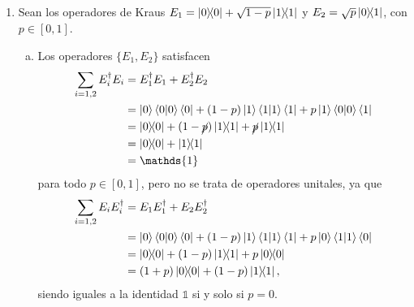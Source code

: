 \documentclass{scrartcl}
\DeclareRobustCommand{\[}{\begin{equation}}
\DeclareRobustCommand{\]}{\end{equation}}
\begin{document}
\begin{enumerate}
    \item Sean los operadores de Kraus $E_1 = \dyad{0}{0} + \sqrt{1 - p} \dyad{1}{1}$ y $E_2 = \sqrt{p} \dyad{0}{1}$, con $p \in [0, 1]$.
    \begin{enumerate}[a)]
        \item Los operadores $\{ E_1, E_2 \}$ satisfacen
        \begin{align}
            \sum_{i = 1, 2} E_i^\dagger E_i &= E_1^\dagger E_1 + E_2^\dagger E_2 \\
                &= \ket{0} \ip{0}{0} \bra{0} + (1 - p) \ket{1} \ip{1}{1} \bra{1} + p \ket{1} \ip{0}{0} \bra{1} \\
                &= \dyad{0}{0} + (1 - \cancel{p}) \dyad{1}{1} + \cancel{p} \dyad{1}{1} \\
                &= \dyad{0}{0} + \dyad{1}{1} \\
                &= \mathds{1}
        \end{align}
        para todo $p \in [0, 1]$, pero no se trata de operadores unitales, ya que
        \begin{align}
            \sum_{i = 1, 2} E_i E_i^\dagger &= E_1 E_1^\dagger + E_2 E_2^\dagger \\
                &= \ket{0} \ip{0}{0} \bra{0} + (1 - p) \ket{1} \ip{1}{1} \bra{1} + p \ket{0} \ip{1}{1} \bra{0} \\
                &= \dyad{0}{0} + (1 - p) \dyad{1}{1} + p \dyad{0}{0} \\
                &= (1 + p) \dyad{0}{0} + (1 - p) \dyad{1}{1},
        \end{align}
        siendo iguales a la identidad $\mathds{1}$ si y solo si $p = 0$.
        

\end{enumerate}
\end{enumerate}
\end{document}
